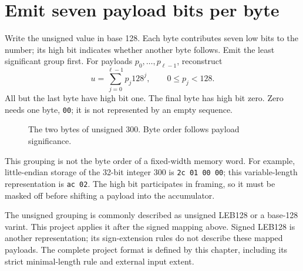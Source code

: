 \section{Emit seven payload bits per byte}
Write the unsigned value in base 128. Each byte contributes seven low bits to the
number; its high bit indicates whether another byte follows. Emit the least significant
group first. For payloads \(p_0,\ldots,p_{\ell-1}\), reconstruct
\[
  u=\sum_{j=0}^{\ell-1}p_j128^j,\qquad0\leq p_j<128.
\]
All but the last byte have high bit one. The final byte has high bit zero. Zero needs
one byte, \texttt{00}; it is not represented by an empty sequence.

\begin{figure}[htbp]
  \centering
  \caption{The two bytes of unsigned 300. Byte order follows payload significance.}
\end{figure}

This grouping is not the byte order of a fixed-width memory word. For example,
little-endian storage of the 32-bit integer 300 is \texttt{2c 01 00 00}; this
variable-length representation is \texttt{ac 02}. The high bit participates in framing,
so it must be masked off before shifting a payload into the accumulator.

The unsigned grouping is commonly described as unsigned LEB128 or a base-128 varint.
This project applies it after the signed mapping above. Signed LEB128 is another
representation; its sign-extension rules do not describe these mapped payloads.
The complete project format is defined by this chapter, including its strict
minimal-length rule and external input extent.
